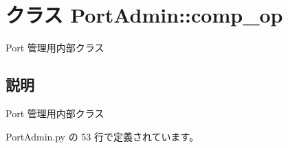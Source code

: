 \section{クラス PortAdmin::comp\_\-op}
\label{classsource__py_1_1_port_admin_1_1_port_admin_1_1comp__op}
Port 管理用内部クラス  




\subsection{説明}
Port 管理用内部クラス 

 PortAdmin.py の 53 行で定義されています。
